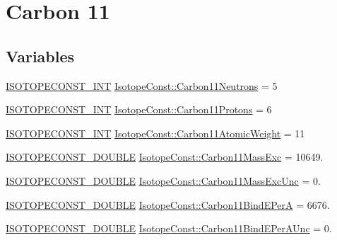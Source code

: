 \hypertarget{group___isotope_const-_carbon-_c11}{}\section{Carbon 11}
\label{group___isotope_const-_carbon-_c11}
\subsection*{Variables}
\begin{DoxyCompactItemize}
\item 
\mbox{\hyperlink{group___isotope_const-_macros_ga5f18360b3e99483a35c32d789e62621c}{I\+S\+O\+T\+O\+P\+E\+C\+O\+N\+S\+T\+\_\+\+I\+NT}} \mbox{\hyperlink{group___isotope_const-_carbon-_c11_gadfcd02cd456f613a7433e051953d0a2b}{Isotope\+Const\+::\+Carbon11\+Neutrons}} = 5
\item 
\mbox{\hyperlink{group___isotope_const-_macros_ga5f18360b3e99483a35c32d789e62621c}{I\+S\+O\+T\+O\+P\+E\+C\+O\+N\+S\+T\+\_\+\+I\+NT}} \mbox{\hyperlink{group___isotope_const-_carbon-_c11_ga33c5bce013abf707489b1d1df546cba5}{Isotope\+Const\+::\+Carbon11\+Protons}} = 6
\item 
\mbox{\hyperlink{group___isotope_const-_macros_ga5f18360b3e99483a35c32d789e62621c}{I\+S\+O\+T\+O\+P\+E\+C\+O\+N\+S\+T\+\_\+\+I\+NT}} \mbox{\hyperlink{group___isotope_const-_carbon-_c11_ga954dad0ec9d02335f810262bc8e8331b}{Isotope\+Const\+::\+Carbon11\+Atomic\+Weight}} = 11
\item 
\mbox{\hyperlink{group___isotope_const-_macros_ga8f45a7272ce02c0b4c65c44636ed719a}{I\+S\+O\+T\+O\+P\+E\+C\+O\+N\+S\+T\+\_\+\+D\+O\+U\+B\+LE}} \mbox{\hyperlink{group___isotope_const-_carbon-_c11_gad252af7a53df2baaab8016f0c3c76250}{Isotope\+Const\+::\+Carbon11\+Mass\+Exc}} = 10649.
\item 
\mbox{\hyperlink{group___isotope_const-_macros_ga8f45a7272ce02c0b4c65c44636ed719a}{I\+S\+O\+T\+O\+P\+E\+C\+O\+N\+S\+T\+\_\+\+D\+O\+U\+B\+LE}} \mbox{\hyperlink{group___isotope_const-_carbon-_c11_ga1f686d42bfa510eed0b855a6667385f7}{Isotope\+Const\+::\+Carbon11\+Mass\+Exc\+Unc}} = 0.
\item 
\mbox{\hyperlink{group___isotope_const-_macros_ga8f45a7272ce02c0b4c65c44636ed719a}{I\+S\+O\+T\+O\+P\+E\+C\+O\+N\+S\+T\+\_\+\+D\+O\+U\+B\+LE}} \mbox{\hyperlink{group___isotope_const-_carbon-_c11_ga684a6640ca05cd887139bfed79b2d651}{Isotope\+Const\+::\+Carbon11\+Bind\+E\+PerA}} = 6676.
\item 
\mbox{\hyperlink{group___isotope_const-_macros_ga8f45a7272ce02c0b4c65c44636ed719a}{I\+S\+O\+T\+O\+P\+E\+C\+O\+N\+S\+T\+\_\+\+D\+O\+U\+B\+LE}} \mbox{\hyperlink{group___isotope_const-_carbon-_c11_ga6f9638650cb6f0a966dff00a5e79cdb1}{Isotope\+Const\+::\+Carbon11\+Bind\+E\+Per\+A\+Unc}} = 0.

\end{DoxyCompactItemize}
